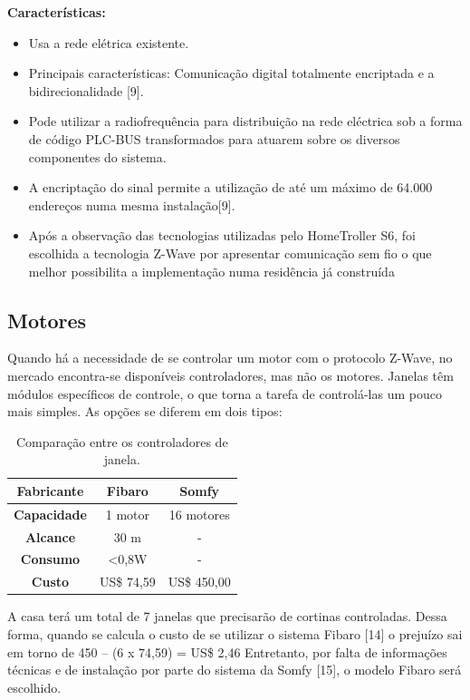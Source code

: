 \textbf{Características:}
\begin{itemize}
\item Usa a rede elétrica existente.
\item Principais características: Comunicação digital totalmente encriptada e a bidirecionalidade [9].
\item Pode utilizar a radiofrequência para distribuição na rede eléctrica sob a forma de código PLC-BUS transformados para atuarem sobre os diversos componentes do sistema.
\item A encriptação do sinal permite a utilização de até um máximo de 64.000 endereços numa mesma instalação[9]. 
\item Após a observação das tecnologias utilizadas pelo HomeTroller S6, foi escolhida a tecnologia Z-Wave por apresentar comunicação sem fio o que melhor possibilita a implementação numa residência já construída
\end{itemize}

\subsection{Motores}

	Quando há a necessidade de se controlar um motor com o protocolo Z-Wave, no mercado encontra-se disponíveis controladores, mas não os motores. Janelas têm módulos específicos de controle, o que torna a tarefa de controlá-las um pouco mais simples. As opções se diferem em dois tipos:

\begin{table}
\centering
\begin{tabular}{|c|c|c|}
\hline 
\textbf{Fabricante} & \textbf{Fibaro} & \textbf{Somfy}\tabularnewline
\hline 
\hline 
\textbf{Capacidade} & 1 motor & 16 motores\tabularnewline
\hline 
\textbf{Alcance} & 30 m & -\tabularnewline
\hline 
\textbf{Consumo} & <0,8W & -\tabularnewline
\hline 
\textbf{Custo} & US\$ 74,59 & US\$ 450,00\tabularnewline
\hline 
\end{tabular}\caption{Comparação entre os controladores de janela.}
\end{table}

	A casa terá um total de 7 janelas que precisarão de cortinas controladas. Dessa forma, quando se calcula o custo de se utilizar o sistema Fibaro [14] o prejuízo sai em torno de 450 – (6 x 74,59) = US\$ 2,46 Entretanto, por falta de informações técnicas e de instalação por parte do sistema da Somfy [15], o modelo Fibaro será escolhido. 

